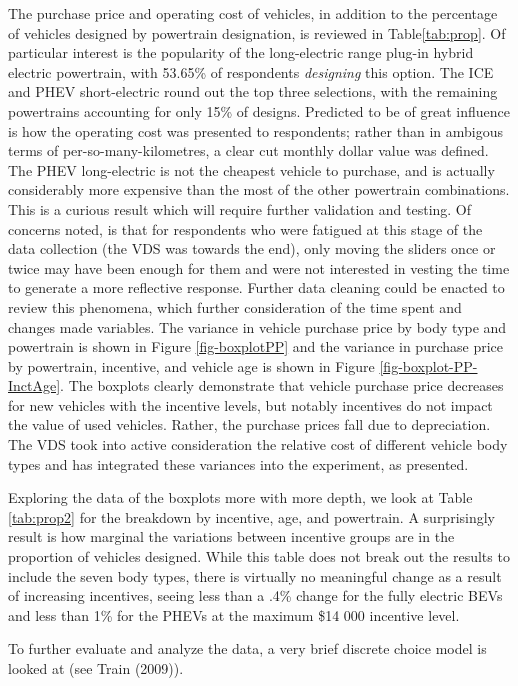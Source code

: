 \documentclass[]{elsarticle} %
\begin{document}
The purchase price and operating cost of vehicles, in addition to the
percentage of vehicles designed by powertrain designation, is reviewed
in Table\ref{tab:prop}. Of particular interest is the popularity of the
long-electric range plug-in hybrid electric powertrain, with 53.65\% of
respondents \emph{designing} this option. The ICE and PHEV
short-electric round out the top three selections, with the remaining
powertrains accounting for only 15\% of designs. Predicted to be of
great influence is how the operating cost was presented to respondents;
rather than in ambigous terms of per-so-many-kilometres, a clear cut
monthly dollar value was defined. The PHEV long-electric is not the
cheapest vehicle to purchase, and is actually considerably more
expensive than the most of the other powertrain combinations. This is a
curious result which will require further validation and testing. Of
concerns noted, is that for respondents who were fatigued at this stage
of the data collection (the VDS was towards the end), only moving the
sliders once or twice may have been enough for them and were not
interested in vesting the time to generate a more reflective response.
Further data cleaning could be enacted to review this phenomena, which
further consideration of the time spent and changes made variables. The
variance in vehicle purchase price by body type and powertrain is shown
in Figure \ref{fig-boxplotPP} and the variance in purchase price by
powertrain, incentive, and vehicle age is shown in Figure
\ref{fig-boxplot-PP-InctAge}. The boxplots clearly demonstrate that
vehicle purchase price decreases for new vehicles with the incentive
levels, but notably incentives do not impact the value of used vehicles.
Rather, the purchase prices fall due to depreciation. The VDS took into
active consideration the relative cost of different vehicle body types
and has integrated these variances into the experiment, as presented.

Exploring the data of the boxplots more with more depth, we look at
Table \ref{tab:prop2} for the breakdown by incentive, age, and
powertrain. A surprisingly result is how marginal the variations between
incentive groups are in the proportion of vehicles designed. While this
table does not break out the results to include the seven body types,
there is virtually no meaningful change as a result of increasing
incentives, seeing less than a .4\% change for the fully electric BEVs
and less than 1\% for the PHEVs at the maximum \$14 000 incentive level.

To further evaluate and analyze the data, a very brief discrete choice
model is looked at (see Train (2009)).
\end{document}
